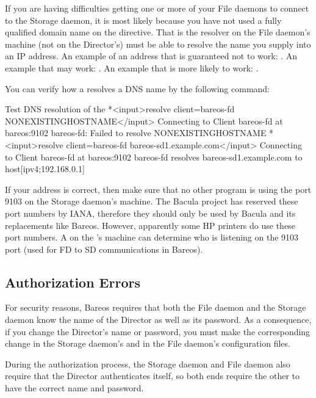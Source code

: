 If you are having difficulties getting one or more of your File daemons to
connect to the Storage daemon, it is most likely because you have not used a
fully qualified domain name on the  directive.
That is the resolver on the File daemon's machine
(not on the Director's) must be able to resolve the name you supply into an IP
address. An example of an address that is guaranteed not to work: .
An example that may work: . An example that is more
likely to work: .

You can verify how a \bareosFd resolves a DNS name by the following command:
\begin{bconsole}{Test DNS resolution of the \bareosFd {}}
*<input>resolve client=bareos-fd NONEXISTINGHOSTNAME</input>
Connecting to Client bareos-fd at bareos:9102
bareos-fd: Failed to resolve NONEXISTINGHOSTNAME
*<input>resolve client=bareos-fd bareos-sd1.example.com</input>
Connecting to Client bareos-fd at bareos:9102
bareos-fd resolves bareos-sd1.example.com to host[ipv4;192.168.0.1]
\end{bconsole}

If your address is correct, then make sure that no other program is using the
port 9103 on the Storage daemon's machine. The Bacula project has reserved 
these port numbers by IANA, therefore they should only be used by Bacula and its replacements like Bareos.
However, apparently
some HP printers do use these port numbers. A 
on the \bareosSd's machine can determine who is listening on the 9103 port (used for FD to SD
communications in Bareos).



\subsection{Authorization Errors}
\label{AuthorizationErrors}

   For security reasons, Bareos requires that both  the File daemon and the
   Storage daemon know the name  of the Director as well as its password. As a
   consequence,  if you change the Director's name or password, you must  make
   the corresponding change in the Storage daemon's and  in the File daemon's
   configuration files.  

   During the authorization process, the Storage daemon and File daemon
   also require that the Director authenticates itself, so both ends
   require the other to have the correct name and password.

